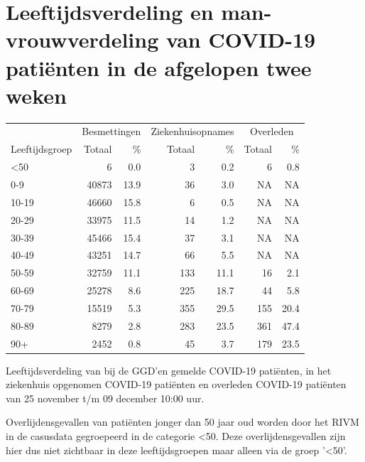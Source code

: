 \documentclass[
  english,
  man,floatsintext]{apa6}
\begin{document}
\hypertarget{leeftijdsverdeling-en-man-vrouwverdeling-van-covid-19-patiuxebnten-in-de-afgelopen-twee-weken}{%
\section{Leeftijdsverdeling en man-vrouwverdeling van COVID-19 patiënten in de afgelopen twee weken}\label{leeftijdsverdeling-en-man-vrouwverdeling-van-covid-19-patiuxebnten-in-de-afgelopen-twee-weken}}

\begin{table}
\centering\begingroup\fontsize{11}{13}\selectfont

\begin{threeparttable}
\begin{tabular}{lrrrrrr}
\toprule
\multicolumn{1}{c}{ } & \multicolumn{2}{c}{Besmettingen} & \multicolumn{2}{c}{Ziekenhuisopnames} & \multicolumn{2}{c}{Overleden} \\
\cmidrule(l{3pt}r{3pt}){2-3} \cmidrule(l{3pt}r{3pt}){4-5} \cmidrule(l{3pt}r{3pt}){6-7}
Leeftijdsgroep & Totaal & \% & Totaal & \% & Totaal & \%\\
\midrule
<50 & 6 & 0.0 & 3 & 0.2 & 6 & 0.8\\
0-9 & 40873 & 13.9 & 36 & 3.0 & NA & NA\\
10-19 & 46660 & 15.8 & 6 & 0.5 & NA & NA\\
20-29 & 33975 & 11.5 & 14 & 1.2 & NA & NA\\
30-39 & 45466 & 15.4 & 37 & 3.1 & NA & NA\\
40-49 & 43251 & 14.7 & 66 & 5.5 & NA & NA\\
50-59 & 32759 & 11.1 & 133 & 11.1 & 16 & 2.1\\
60-69 & 25278 & 8.6 & 225 & 18.7 & 44 & 5.8\\
70-79 & 15519 & 5.3 & 355 & 29.5 & 155 & 20.4\\
80-89 & 8279 & 2.8 & 283 & 23.5 & 361 & 47.4\\
90+ & 2452 & 0.8 & 45 & 3.7 & 179 & 23.5\\
\bottomrule
\end{tabular}
\begin{tablenotes}
\item[1] Leeftijdsverdeling van bij de GGD’en gemelde COVID-19 patiënten, in het ziekenhuis opgenomen COVID-19 patiënten en overleden COVID-19 patiënten van 25 november t/m 09 december 10:00 uur.
\item[2] Overlijdensgevallen van patiënten jonger dan 50 jaar oud worden door het RIVM in de casusdata gegroepeerd in de categorie <50. Deze overlijdensgevallen zijn hier dus niet zichtbaar in deze leeftijdsgroepen maar alleen via de groep '<50'.
\end{tablenotes}
\end{threeparttable}
\endgroup{}
\end{table}
\end{document}

